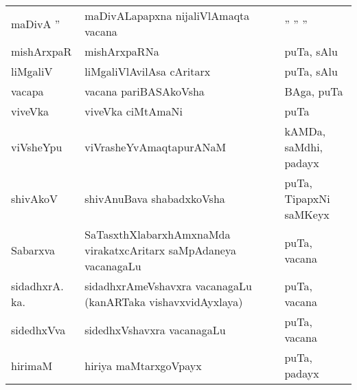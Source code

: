 {\begin{longtable}{lll}
maDivA '' & maDivALapapxna nijaliVlAmaqta vacana & \qquad '' '' ''\\
mishArxpaR & mishArxpaRNa & puTa, sAlu\\
liMgaliV & liMgaliVlAvilAsa cAritarx & puTa, sAlu\\
vacapa & vacana pariBASAkoVsha & BAga, puTa\\
viveVka & viveVka ciMtAmaNi & puTa\\
viVsheYpu & viVrasheYvAmaqtapurANaM & kAMDa, saMdhi, padayx\\
shivAkoV & shivAnuBava shabadxkoVsha & puTa, TipapxNi saMKeyx\\
Sabarxva & SaTasxthXlabarxhAmxnaMda virakatxcAritarx saMpAdaneya vacanagaLu & puTa, vacana\\
sidadhxrA. ka. & sidadhxrAmeVshavxra vacanagaLu (kanARTaka vishavxvidAyxlaya) & puTa, vacana\\
sidedhxVva & sidedhxVshavxra vacanagaLu & puTa, vacana\\
hirimaM & hiriya maMtarxgoVpayx & puTa, padayx\\
\hline
\end{longtable}}


\newpage

